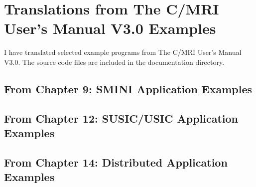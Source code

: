 \section{Translations from The C/MRI User's Manual V3.0 Examples}

I have translated selected example programs from The C/MRI User's Manual
V3.0\cite{Chubb03}.  The source code files are included in the
documentation directory.

\subsection{From Chapter 9: SMINI Application Examples}


\subsection{From Chapter 12: SUSIC/USIC Application Examples}


\subsection{From Chapter 14: Distributed Application Examples}


